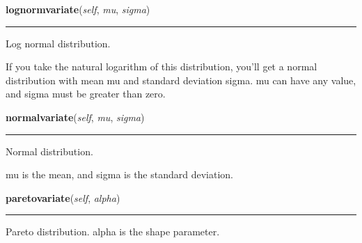 \hspace{.8\funcindent}\begin{boxedminipage}{\funcwidth}

    \raggedright \textbf{lognormvariate}(\textit{self}, \textit{mu}, \textit{sigma})

    \vspace{-1.5ex}

    \rule{\textwidth}{0.5\fboxrule}
\setlength{\parskip}{2ex}
    Log normal distribution.

    If you take the natural logarithm of this distribution, you'll get a 
    normal distribution with mean mu and standard deviation sigma. mu can 
    have any value, and sigma must be greater than zero.

\setlength{\parskip}{1ex}
    \end{boxedminipage}

    \label{random:Random:normalvariate}

    \vspace{0.5ex}

\hspace{.8\funcindent}\begin{boxedminipage}{\funcwidth}

    \raggedright \textbf{normalvariate}(\textit{self}, \textit{mu}, \textit{sigma})

    \vspace{-1.5ex}

    \rule{\textwidth}{0.5\fboxrule}
\setlength{\parskip}{2ex}
    Normal distribution.

    mu is the mean, and sigma is the standard deviation.

\setlength{\parskip}{1ex}
    \end{boxedminipage}

    \label{random:Random:paretovariate}

    \vspace{0.5ex}

\hspace{.8\funcindent}\begin{boxedminipage}{\funcwidth}

    \raggedright \textbf{paretovariate}(\textit{self}, \textit{alpha})

    \vspace{-1.5ex}

    \rule{\textwidth}{0.5\fboxrule}
\setlength{\parskip}{2ex}
    Pareto distribution.  alpha is the shape parameter.

\setlength{\parskip}{1ex}
    \end{boxedminipage}

